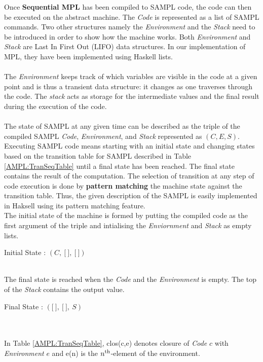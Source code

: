 \documentclass[11pt]{article}
\newcommand{\<}{\langle}
\renewcommand{\>}{\rangle}
\begin{document}
Once {\bf Sequential MPL} has been compiled to SAMPL code, the code can then be executed on the abstract machine. The {\em Code} is represented as a list of SAMPL commands. Two other structures namely the {\em Environment} and the {\em Stack} need to be introduced in order to show how the machine works. Both {\em Environment} and {\em Stack} are Last In First Out (LIFO) data structures. In our implementation of MPL, they have been implemented using Haskell lists. 
~~\\~~\\
The {\em Environment} keeps track of which variables are visible in the code at a given point and is thus a transient data structure: it changes as one traverses through the code. The {\em stack} acts as storage for the intermediate values and the final result during the execution of the code. 
~~\\~~\\ 
The state of SAMPL at any given time can be described as the triple of the compiled SAMPL {\em Code}, {\em Environment}, and {\em Stack} represented as $(C,E,S)$. Executing SAMPL code means starting with an initial state and changing states based on the transition table for SAMPL described in Table \ref {AMPL:TranSeqTable} until a final state has been reached. The final state contains the result of the computation. The selection of transition at any step of code execution is done by {\bf pattern matching} the machine state against the transition table. Thus, the given description of the SAMPL is easily implemented in Haksell using its pattern matching feature.
~~\\
The initial state of the machine is formed by putting the compiled code as the first argument of the triple and intialising the {\em Enviornment} and {\em Stack} as empty lists.
~~\\
\begin{center}
Initial State : $(C,~\lbrack~\rbrack,~\lbrack~\rbrack)$
\end{center}
~~\\
The final state is reached when the {\em Code} and the {\em Environment} is empty. The top of the {\em Stack} contains the output value.
~~\\ 
\begin{center}
Final State : $(\lbrack~\rbrack,~\lbrack~\rbrack,~S)$
\end{center}
~~\\~~\\
In Table \ref {AMPL:TranSeqTable}, {\sf clos(c,e)} denotes closure of {\em Code} $c$ with {\em Environment} $e$ and {\sf e(n)} is the $n^{\rm th}$-element of the environment.
\end{document}
